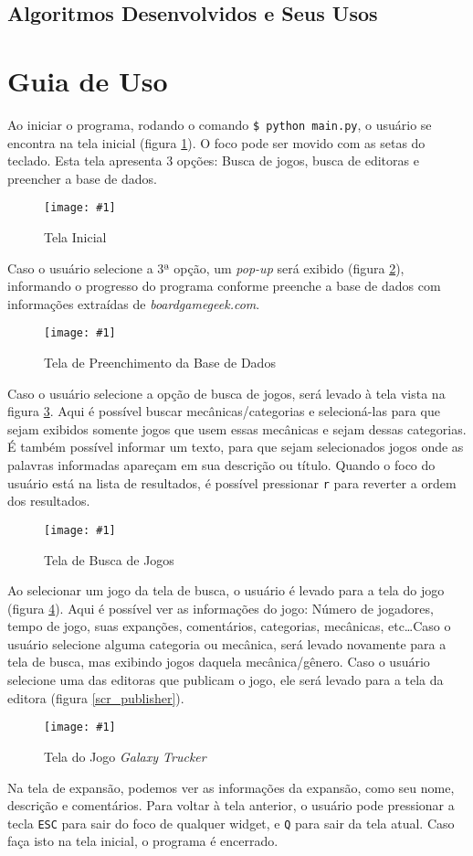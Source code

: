 \documentclass[hidelinks,12pt,article,twocolumn,brazil]{abntex2}
\newcommand{\imagem}[3]{\begin{figure}[htb]
    \begin{center}
        \texttt{[image: \#1]}\\
        \caption{#2}
        \label{#3}
    \end{center}
\end{figure}}
\def\bgg{\textit{boardgamegeek.com}}
\begin{document}
\subsection{Algoritmos Desenvolvidos e Seus Usos}

\section{Guia de Uso}

Ao iniciar o programa, rodando o comando \texttt{\$ python main.py}, o usuário se encontra na tela inicial (figura \ref{scr_init}). O foco pode ser movido com as setas do teclado. Esta tela apresenta 3 opções: Busca de jogos, busca de editoras e preencher a base de dados.

\imagem{img/scr_init.png}{Tela Inicial}{scr_init}

Caso o usuário selecione a 3ª opção, um \textit{pop-up} será exibido (figura \ref{scr_fill}), informando o progresso do programa conforme preenche a base de dados com informações extraídas de \bgg.

\imagem{img/scr_fill}{Tela de Preenchimento da Base de Dados}{scr_fill}

Caso o usuário selecione a opção de busca de jogos, será levado à tela vista na figura \ref{scr_search}. Aqui é possível buscar mecânicas/categorias e selecioná-las para que sejam exibidos somente jogos que usem essas mecânicas e sejam dessas categorias. É também possível informar um texto, para que sejam selecionados jogos onde as palavras informadas apareçam em sua descrição ou título. Quando o foco do usuário está na lista de resultados, é possível pressionar \texttt{r} para reverter a ordem dos resultados.

\imagem{img/scr_search.png}{Tela de Busca de Jogos}{scr_search}

Ao selecionar um jogo da tela de busca, o usuário é levado para a tela do jogo (figura \ref{scr_game}). Aqui é possível ver as informações do jogo: Número de jogadores, tempo de jogo, suas expanções, comentários, categorias, mecânicas, etc\ldots Caso o usuário selecione alguma categoria ou mecânica, será levado novamente para a tela de busca, mas exibindo jogos daquela mecânica/gênero. Caso o usuário selecione uma das editoras que publicam o jogo, ele será levado para a tela da editora (figura \ref{scr_publisher}).

\imagem{img/scr_game.png}{Tela do Jogo \textit{Galaxy Trucker}}{scr_game}

Na tela de expansão, podemos ver as informações da expansão, como seu nome, descrição e comentários. Para voltar à tela anterior, o usuário pode pressionar a tecla \texttt{ESC} para sair do foco de qualquer widget, e \texttt{Q} para sair da tela atual. Caso faça isto na tela inicial, o programa é encerrado.
\end{document}
